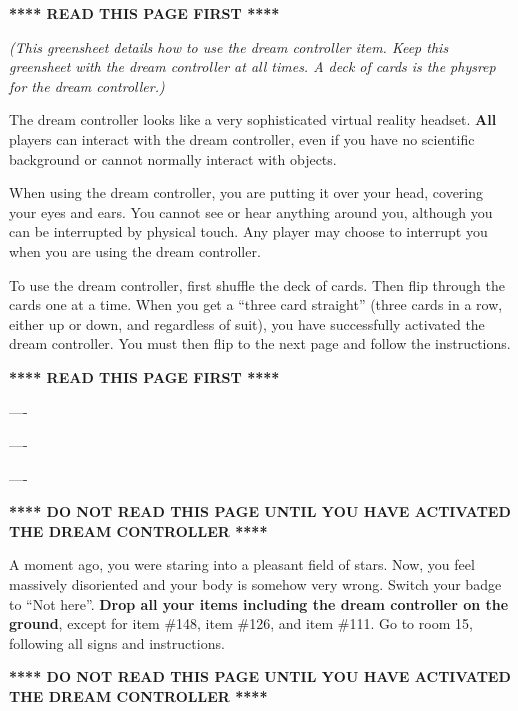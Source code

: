 \documentclass[green]{guildcamp1}
\begin{document}
\name{\gDreamController{}}

\textbf{**** READ THIS PAGE FIRST ****}

\emph{(This greensheet details how to use the dream controller item. Keep this greensheet with the dream controller at all times. A deck of cards is the physrep for the dream controller.)}

The dream controller looks like a very sophisticated virtual reality headset. \textbf{All} players can interact with the dream controller, even if you have no scientific background or cannot normally interact with objects.

When using the dream controller, you are putting it over your head, covering your eyes and ears. You cannot see or hear anything around you, although you can be interrupted by physical touch. Any player may choose to interrupt you when you are using the dream controller.

To use the dream controller, first shuffle the deck of cards. Then flip through the cards one at a time. When you get a ``three card straight'' (three cards in a row, either up or down, and regardless of suit), you have successfully activated the dream controller. You must then flip to the next page and follow the instructions.

\textbf{**** READ THIS PAGE FIRST ****}

----

----

----

\textbf{**** DO NOT READ THIS PAGE UNTIL YOU HAVE ACTIVATED THE DREAM CONTROLLER ****}

A moment ago, you were staring into a pleasant field of stars. Now, you feel massively disoriented and your body is somehow very wrong. Switch your badge to ``Not here''. \textbf{Drop all your items including the dream controller on the ground}, except for item \#148, item \#126, and item \#111. Go to room 15, following all signs and instructions.

\textbf{**** DO NOT READ THIS PAGE UNTIL YOU HAVE ACTIVATED THE DREAM CONTROLLER ****}
\end{document}
